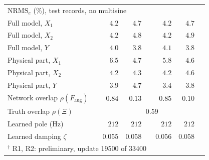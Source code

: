 \begin{tabular}{l r r r r r r r}
\multicolumn{8}{l}{$\mathrm{NRMS}_e$ (\%), test records, no multisine}\\
Full model, $X_1$ &  & $4.2$ & $4.7$ &  & $4.2$ & $4.7$ & \\
Full model, $X_2$ &  & $4.2$ & $4.8$ &  & $4.2$ & $4.9$ & \\
Full model, $Y$ &  & $4.0$ & $3.8$ &  & $4.1$ & $3.8$ & \\
Physical part, $X_1$ &  & $6.5$ & $4.7$ &  & $5.8$ & $4.6$ & \\
Physical part, $X_2$ &  & $4.2$ & $4.3$ &  & $4.2$ & $4.6$ & \\
Physical part, $Y$ &  & $3.9$ & $4.7$ &  & $3.4$ & $3.8$ & \\
\midrule
Network overlap $\rho(F_{\mathrm{aug}})$ &  & $0.84$ & $0.13$ &  & $0.85$ & $0.10$ & \\
Truth overlap $\rho(\Xi)$ & & \multicolumn{6}{c}{$0.59$}\\
Learned pole (Hz) &  & $212$ & $212$ &  & $212$ & $212$ & \\
Learned damping $\zeta$ &  & $0.055$ & $0.058$ &  & $0.056$ & $0.058$ & \\
\bottomrule
\multicolumn{8}{l}{\footnotesize $^\dagger$ R1, R2: preliminary, update 19500 of 33400}\\
\end{tabular}
